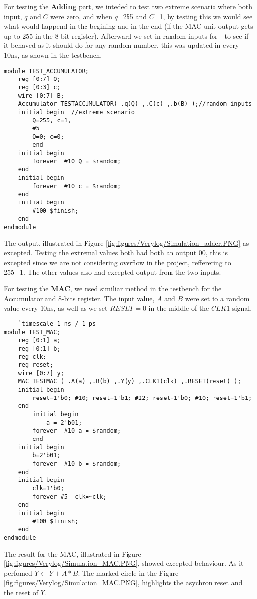 For testing the \textbf{Adding} part, we inteded to test two extreme scenario where both input, $q$ and $C$ were zero, and when $q$=255 and $C$=1, by testing this we would see what would happend in the begining and in the end (if the MAC-unit output gets up to 255 in the 8-bit register). Afterward we set in random inputs for - to see if it behaved as it should do for any random number, this was updated in every 10ns, as shown in the testbench.

\begin{lstlisting}
module TEST_ACCUMULATOR;
	reg [0:7] Q;
	reg [0:3] c;
	wire [0:7] B;  
	Accumulator TESTACCUMULATOR( .q(Q) ,.C(c) ,.b(B) );//random inputs	  
	initial begin  //extreme scenario
		Q=255; c=1;
		#5
		Q=0; c=0;
		end
	initial begin 
  		forever	 #10 Q = $random;
	end	  
	initial begin
  		forever	 #10 c = $random;
	end	
	initial begin
		#100 $finish;
	end	  
endmodule	
\end{lstlisting}
The output, illustrated in Figure \ref{fig:figures/Verylog/Simulation_adder.PNG} as excepted. Testing the extremal values both had both an output 00, this is excepted since we are not considering overflow in the project, refferering to 255+1. The other values also had excepted output from the two inputs. 


For testing the \textbf{MAC}, we used similiar method in the testbench for the Accumulator and 8-bits register. The input value, $A$ and $B$ were set to a random value every 10ns, as well as we set $RESET=0$ in the middle of the $CLK1$ signal.
\begin{lstlisting}
    `timescale 1 ns / 1 ps
module TEST_MAC;
	reg [0:1] a;
	reg [0:1] b;
	reg clk;
	reg reset;
	wire [0:7] y;
	MAC TESTMAC ( .A(a) ,.B(b) ,.Y(y) ,.CLK1(clk) ,.RESET(reset) );	
	initial begin
		reset=1'b0; #10; reset=1'b1; #22; reset=1'b0; #10; reset=1'b1;	
	end
		initial begin
			a = 2'b01;
  		forever	 #10 a = $random;
        end	  
	initial begin
		b=2'b01;
  		forever	 #10 b = $random;
	end	
	initial begin
		clk=1'b0;
		forever #5	clk=~clk;
	end	
	initial begin
		#100 $finish;
	end	
endmodule	
\end{lstlisting}
The result for the MAC, illustrated in Figure \ref{fig:figures/Verylog/Simulation_MAC.PNG}, showed excepted behaviour. As it perfomed $Y$$\leftarrow$$ Y+ A*B $. The marked circle in the Figure \ref{fig:figures/Verylog/Simulation_MAC.PNG}, highlights the asychron reset and the reset of $Y$.


